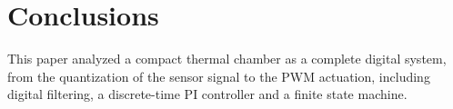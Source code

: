 \section{Conclusions}

This paper analyzed a compact thermal chamber as a complete digital system, from the quantization
of the sensor signal to the PWM actuation, including digital filtering, a discrete-time PI
controller and a finite state machine. 
